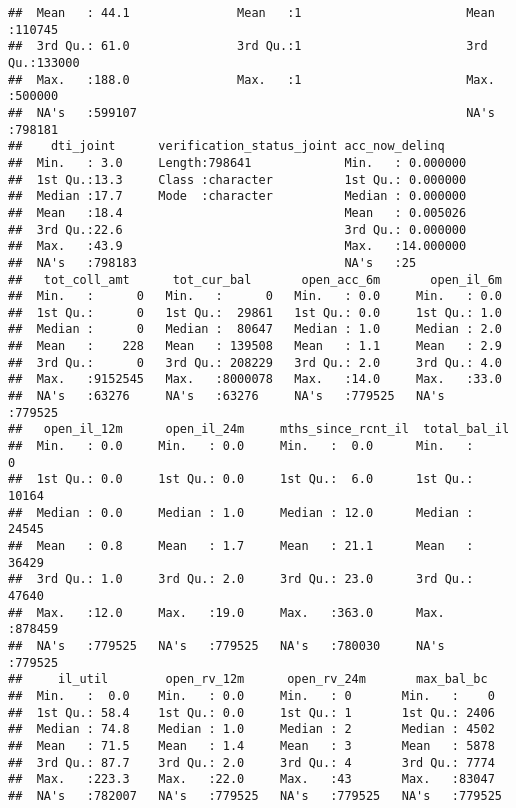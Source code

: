 \documentclass[
]{article}
\begin{document}
\begin{verbatim}
##  Mean   : 44.1               Mean   :1                       Mean   :110745  
##  3rd Qu.: 61.0               3rd Qu.:1                       3rd Qu.:133000  
##  Max.   :188.0               Max.   :1                       Max.   :500000  
##  NA's   :599107                                              NA's   :798181  
##    dti_joint      verification_status_joint acc_now_delinq     
##  Min.   : 3.0     Length:798641             Min.   : 0.000000  
##  1st Qu.:13.3     Class :character          1st Qu.: 0.000000  
##  Median :17.7     Mode  :character          Median : 0.000000  
##  Mean   :18.4                               Mean   : 0.005026  
##  3rd Qu.:22.6                               3rd Qu.: 0.000000  
##  Max.   :43.9                               Max.   :14.000000  
##  NA's   :798183                             NA's   :25         
##   tot_coll_amt      tot_cur_bal       open_acc_6m       open_il_6m    
##  Min.   :      0   Min.   :      0   Min.   : 0.0     Min.   : 0.0    
##  1st Qu.:      0   1st Qu.:  29861   1st Qu.: 0.0     1st Qu.: 1.0    
##  Median :      0   Median :  80647   Median : 1.0     Median : 2.0    
##  Mean   :    228   Mean   : 139508   Mean   : 1.1     Mean   : 2.9    
##  3rd Qu.:      0   3rd Qu.: 208229   3rd Qu.: 2.0     3rd Qu.: 4.0    
##  Max.   :9152545   Max.   :8000078   Max.   :14.0     Max.   :33.0    
##  NA's   :63276     NA's   :63276     NA's   :779525   NA's   :779525  
##   open_il_12m      open_il_24m     mths_since_rcnt_il  total_bal_il   
##  Min.   : 0.0     Min.   : 0.0     Min.   :  0.0      Min.   :     0  
##  1st Qu.: 0.0     1st Qu.: 0.0     1st Qu.:  6.0      1st Qu.: 10164  
##  Median : 0.0     Median : 1.0     Median : 12.0      Median : 24545  
##  Mean   : 0.8     Mean   : 1.7     Mean   : 21.1      Mean   : 36429  
##  3rd Qu.: 1.0     3rd Qu.: 2.0     3rd Qu.: 23.0      3rd Qu.: 47640  
##  Max.   :12.0     Max.   :19.0     Max.   :363.0      Max.   :878459  
##  NA's   :779525   NA's   :779525   NA's   :780030     NA's   :779525  
##     il_util        open_rv_12m      open_rv_24m       max_bal_bc    
##  Min.   :  0.0    Min.   : 0.0     Min.   : 0       Min.   :    0   
##  1st Qu.: 58.4    1st Qu.: 0.0     1st Qu.: 1       1st Qu.: 2406   
##  Median : 74.8    Median : 1.0     Median : 2       Median : 4502   
##  Mean   : 71.5    Mean   : 1.4     Mean   : 3       Mean   : 5878   
##  3rd Qu.: 87.7    3rd Qu.: 2.0     3rd Qu.: 4       3rd Qu.: 7774   
##  Max.   :223.3    Max.   :22.0     Max.   :43       Max.   :83047   
##  NA's   :782007   NA's   :779525   NA's   :779525   NA's   :779525  

\end{verbatim}
\end{document}
